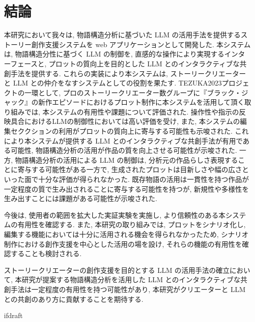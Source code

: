 \documentclass[a4j,12pt]{jsreport}
\begin{document}
\pagestyle{fancy}
\lhead{\rightmark}
\renewcommand{\chaptermark}[1]{\markboth{第\ \thechapter\ 章\ #1}{}}
\fi

\chapter{結論}\label{chap:conclusion}
本研究において我々は, 物語構造分析に基づいた LLM の活用手法を提供するストーリー創作支援システムを web アプリケーションとして開発した. 本システムは, 物語構造分性に基づく LLM の制御を, 直感的な操作により実現するインターフェースと, プロットの質向上を目的とした LLM とのインタラクティブな共創手法を提供する. これらの実装により本システムは, ストーリークリエーターと LLM との仲介をなすシステムとしての役割を果たす. TEZUKA2023プロジェクトの一環として, プロのストーリークリエーター数グループに『ブラック・ジャック』の新作エピソードにおけるプロット制作に本システムを活用して頂く取り組みでは, 本システムの有用性や課題について評価された. 操作性や指示の反映具合におけるLLMの制御性においては高い評価を受け, また, 本システムの編集セククションの利用がプロットの質向上に寄与する可能性も示唆された. これにより本システムが提供する LLM とのインタラクティブな共創手法が有用である可能性, 物語構造分析の活用が作品の質を向上させる可能性が示唆された. 一方, 物語構造分析の活用による LLM の制御は, 分析元の作品らしさ表現することに寄与する可能性がある一方で, 生成されたプロットは目新しさや幅の広さといった面で十分な評価が得られなかった. 既存物語の活用は一貫性を持つ作品が一定程度の質で生み出されることに寄与する可能性を持つが, 新規性や多様性を生み出すことには課題がある可能性が示唆された. 

今後は, 使用者の範囲を拡大した実証実験を実施し, より信頼性のある本システムの有用性を確認する. また, 本研究の取り組みでは, プロットをシナリオ化し, 編集する機能においては十分に活用される機会を得られなかったため, シナリオ制作における創作支援を中心とした活用の場を設け, それらの機能の有用性を確認することも検討される.

ストーリークリエーターの創作支援を目的とする LLM の活用手法の確立において, 本研究が提案する物語構造分析を活用した LLM とのインタラクティブな共創手法は一定程度の有用性を持つ可能性があり, 本研究がクリエーターと LLM との共創のあり方に貢献することを期待する.



\expandafter\ifx\csname ifdraft\endcsname\relax
\fancyhead[LO]{}
\printbibliography[title=参考文献]
\end{document}
